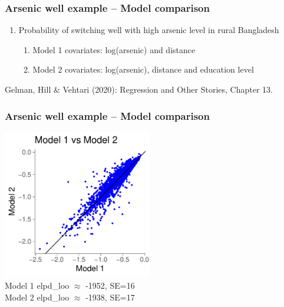 \documentclass[10pt]{beamer}
\begin{document}






\begin{frame}{}

\frametitle{Arsenic well example -- Model comparison}

\begin{enumerate}
\item Probability of switching well with high arsenic level in rural Bangladesh
  \begin{enumerate}
    \item Model 1 covariates: log(arsenic) and distance
    \item Model 2 covariates: log(arsenic), distance and education level
  \end{enumerate}
\end{enumerate}

\vspace{10\baselineskip}
{\small Gelman, Hill \& Vehtari (2020): Regression and Other Stories, Chapter 13.}

\end{frame}

\begin{frame}

\frametitle{Arsenic well example -- Model comparison}

  {\includegraphics[width=6.5cm]{figs/arsenicelpdloo.pdf}}
  \\
  {Model 1 elpd\_loo $\approx$ -1952, SE=16\\
  Model 2 elpd\_loo $\approx$ -1938, SE=17}

\end{frame}
\end{document}
